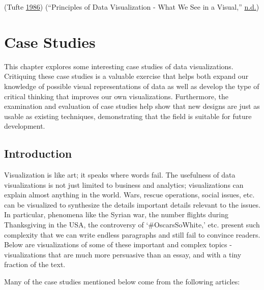 \documentclass[]{book}
\begin{document}
(Tufte \protect\hyperlink{ref-The-Visual-Display-of-Quantitative-Information}{1986})
(``Principles of Data Visualization - What We See in a Visual,'' \protect\hyperlink{ref-fusioncharts}{n.d.})

\hypertarget{case-studies}{%
\chapter{Case Studies}\label{case-studies}}

This chapter explores some interesting case studies of data visualizations. Critiquing these case studies is a valuable exercise that helps both expand our knowledge of possible visual representations of data as well as develop the type of critical thinking that improves our own visualizations. Furthermore, the examination and evaluation of case studies help show that new designs are just as usable as existing techniques, demonstrating that the field is suitable for future development.

\hypertarget{introduction-1}{%
\section{Introduction}\label{introduction-1}}

Visualization is like art; it speaks where words fail. The usefulness of data visualizations is not just limited to business and analytics; visualizations can explain almost anything in the world. Wars, rescue operations, social issues, etc. can be visualized to synthesize the details important details relevant to the issues. In particular, phenomena like the Syrian war, the number flights during Thanksgiving in the USA, the controversy of `\#OscarsSoWhite,' etc. present such complexity that we can write endless paragraphs and still fail to convince readers. Below are visualizations of some of these important and complex topics - visualizations that are much more persuasive than an essay, and with a tiny fraction of the text.

Many of the case studies mentioned below come from the following articles:
\end{document}
